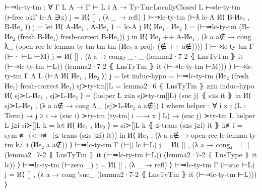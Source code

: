 \documentclass[logo,bsc,singlespacing,parskip,online]{infthesis}
\renewenvironment{code}{\mintedcopy[breaklines,breaksymbolleft=\;]{agda}}{\endmintedcopy}
\begin{document}
\begin{code}
  ⊢⇒lc-ty-tm : ∀ {Γ L A} → Γ ⊢ L ⦂ A → Ty-Tm-LocallyClosed L
  ⊢⇒lc-ty-tm (⊢free okΓ lc-A ∋x) j = И⟨ [] , (λ _ → refl) ⟩
  ⊢⇒lc-ty-tm (⊢ƛ lc-A И⟨ B-Иe₁ , B-Иe₂ ⟩) j =
    let И⟨ A-Иe₁ , A-Иe₂ ⟩ = lc-A j
        И⟨ Иe₁ , Иe₂ ⟩ = (⊢⇒lc-ty-tm (B-Иe₂ (fresh B-Иe₁) {fresh-correct B-Иe₁})) j
    in И⟨ Иe₁ ++ A-Иe₁ , (λ a {a∉} → cong ƛ_
      (open-rec-lc-lemma-ty-tm-tm-tm (Иe₂ a {proj₁ (∉-++ a∉)}))) ⟩
  ⊢⇒lc-ty-tm {Γ} (⊢· ⊢L ⊢M) j = И⟨ [] , (λ a → cong₂ _·_
    (lemma2·7-2 ⦃ LnsTyTm ⦄ it (⊢⇒lc-ty-tm ⊢L))
    (lemma2·7-2 ⦃ LnsTyTm ⦄ it (⊢⇒lc-ty-tm ⊢M))) ⟩
  ⊢⇒lc-ty-tm {Γ} {Λ L} (⊢Λ И⟨ Иe₁ , Иe₂ ⟩) j =
      let induc-hypo = ⊢⇒lc-ty-tm (Иe₂ (fresh Иe₁) {fresh-correct Иe₁})
          sj≻ty-tm[]L = lemma2·6 ⦃ LnsTyTm ⦄ z≤n induc-hypo
          И⟨ sj≻L-Иe₁ , sj≻L-Иe₂ ⟩ = (helper L z≤n sj≻ty-tm[]L) (suc j) ⦃ s≤s it ⦄
      in И⟨ sj≻L-Иe₁ , (λ a {a∉} → cong Λ_ (sj≻L-Иe₂ a {a∉})) ⟩
    where
      helper : ∀ {i x j} (L : Term) → j ≥ i → (suc i) ≻ty-tm (ty-tm[ i —→ x ] L) → (suc j) ≻ty-tm L
      helper L j≥i si≻[]L k =
        let И⟨ Иe₁ , Иe₂ ⟩ = si≻[]L k ⦃ ≤-trans (s≤s j≥i) it ⦄
            k≢i = sym-≢ (<⇒≢ (≤-trans (s≤s j≥i) it))
        in И⟨ Иe₁ , (λ a {a∉} → open-rec-lc-lemma-ty-tm k≢i (Иe₂ a {a∉})) ⟩
  ⊢⇒lc-ty-tm {Γ} (⊢[] lc ⊢L) j = И⟨ [] , (λ a → cong₂ _[_]
    (lemma2·7-2 ⦃ LnsTyTm ⦄ it (⊢⇒lc-ty-tm ⊢L))
    (lemma2·7-2 ⦃ LnsType ⦄ it lc)) ⟩
  ⊢⇒lc-ty-tm (⊢zero _) j = И⟨ [] , (λ _ → refl) ⟩
  ⊢⇒lc-ty-tm {Γ} (⊢suc ⊢L) j = И⟨ [] , (λ a →
    cong ‵suc_ (lemma2·7-2 ⦃ LnsTyTm ⦄ it (⊢⇒lc-ty-tm ⊢L))) ⟩
\end{code}
\end{document}
